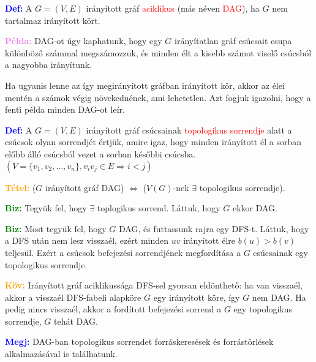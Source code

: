 \documentclass[../../szobeli.tex]{subfiles}
\begin{document}
\begin{itemize}
        \textcolor{blue}{\textbf{Def:}} A $G = (V,E)$ irányított gráf \textcolor{red}{aciklikus} (más néven \textcolor{red}{DAG}), ha $G$ nem tartalmaz irányított kört.

        \textcolor{violet}{\textbf{Példa:}} DAG-ot úgy kaphatunk, hogy egy $G$ irányítatlan gráf csúcsait csupa különböző számmal megszámozzuk, és minden élt a kisebb számot viselő csúcsból a nagyobba irányítunk.

        Ha ugyanis lenne az így megirányított gráfban irányított kör, akkor az élei mentén a számok végig növekednének, ami lehetetlen. Azt fogjuk igazolni, hogy a fenti példa minden DAG-ot leír.

        \textcolor{blue}{\textbf{Def:}} A $G = (V,E)$ irányított gráf csúcsainak \textcolor{red}{topologikus sorrendje} alatt a csúcsok olyan sorrendjét értjük, amire igaz, hogy minden irányított él a sorban előbb álló csúcsból vezet a sorban későbbi csúcsba. $(V=\{v_1,v_2,\dots,v_n\},v_iv_j \in E \Rightarrow i < j)$

        \textcolor{orange}{\textbf{Tétel:}} ($G$ irányított gráf DAG) $\Leftrightarrow$ ($V(G)$-nek $\exists$ topologikus sorrendje).

        \textcolor{green}{\textbf{Biz:}} Tegyük fel, hogy $\exists$ toplogikus sorrend. Láttuk, hogy $G$ ekkor DAG. \checkmark

        \textcolor{green}{\textbf{Biz:}} Most tegyük fel, hogy $G$ DAG, és futtassunk rajra egy DFS-t. Láttuk, hogy a DFS után nem lesz visszaél, ezért minden $uv$ irányított élre $b(u) > b(v)$ teljesül. Ezért a csúcsok befejezési sorrendjének megfordítása a $G$ csúcsainak egy topologikus sorrendje.   

        \textcolor{orange}{\textbf{Köv:}} Irányított gráf aciklikussága DFS-sel gyorsan eldönthető: ha van visszaél, akkor a visszaél DFS-fabeli alapköre $G$ egy irányított köre, így $G$ nem DAG. Ha pedig nincs visszaél, akkor a fordított befejezési sorrend a $G$ egy topologikus sorrendje, $G$ tehát DAG.

        \textcolor{blue}{\textbf{Megj:}} DAG-ban topologikus sorrendet forráskeresések és forrástörlések alkalmazásával is találhatunk.

    \end{itemize}
\end{document}
